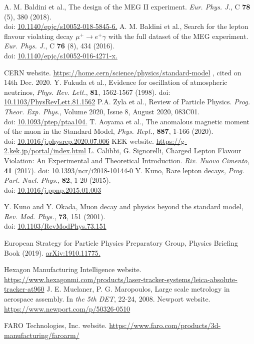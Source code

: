 \documentclass[report]{jsbook}
\begin{document}
\begin{thebibliography}{99}
 A. M. Baldini et al., The design of the MEG II experiment. {\it Eur. Phys. J.}, C {\bf 78} (5), 380 (2018). \\ 
doi: \href{https://doi.org/10.1140/epjc/s10052-018-5845-6}{10.1140/epjc/s10052-018-5845-6.}
 A. M. Baldini et al., Search for the lepton flavour violating decay $\mu^+ \to e^+ \gamma$ with the full dataset of the MEG experiment. {\it Eur. Phys. J.}, C {\bf 76} (8), 434 (2016). \\ 
doi: \href{https://doi.org/10.1140/epjc/s10052-016-4271-x}{10.1140/epjc/s10052-016-4271-x.}

 CERN website. \url{https://home.cern/science/physics/standard-model} , cited on 14th Dec. 2020.
 Y. Fukuda et al., Evidence for oscillation of atmospheric neutrinos, {\it Phys. Rev. Lett.}, {\bf 81}, 1562-1567 (1998). 
doi: \href{https://doi.org/10.1103/PhysRevLett.81.1562}{10.1103/PhysRevLett.81.1562}
 P.A. Zyla et al., Review of Particle Physics.  {\it Prog. Theor. Exp. Phys.}, Volume 2020, Issue 8, August 2020, 083C01. \\
doi: \href{https://doi.org/10.1093/ptep/ptaa104}{10.1093/ptep/ptaa104.}
 T. Aoyama et al., The anomalous magnetic moment of the muon in the Standard Model, {\it Phys. Rept.}, {\bf 887}, 1-166 (2020). \\
doi: \href{https://doi.org/10.1016/j.physrep.2020.07.006}{10.1016/j.physrep.2020.07.006}
 KEK website. \url{https://g-2.kek.jp/portal/index.html}
 L. Calibbi, G. Signorelli, Charged Lepton Flavour Violation: An Experimental and Theoretical Introduction. {\it Riv. Nuovo Cimento}, {\bf 41} (2017).
doi: \href{https://doi.org/10.1393/ncr/i2018-10144-0}{10.1393/ncr/i2018-10144-0}
 Y. Kuno, Rare lepton decays, {\it Prog. Part. Nucl. Phys.}, {\bf 82}, 1-20 (2015). \\
doi: \href{https://doi.org/10.1016/j.ppnp.2015.01.003}{10.1016/j.ppnp.2015.01.003}


 Y. Kuno and Y. Okada, Muon decay and physics beyond the standard model, {\it Rev. Mod. Phys.}, {\bf 73}, 151 (2001). \\
doi: \href{http://dx.doi.org/10.1103/RevModPhys.73.151}{10.1103/RevModPhys.73.151}

 European Strategy for Particle Physics Preparatory Group, Physics Briefing Book (2019). \href{http://arxiv.org/abs/1910.11775}{arXiv:1910.11775.} 

 Hexagon Manufacturing Intelligence website. \url{https://www.hexagonmi.com/products/laser-tracker-systems/leica-absolute-tracker-at960}
 J. E. Muelaner, P. G. Maropoulos, Large scale metrology in aerospace assembly. In {\it the 5th DET}, 22-24, 2008.
 Newport website. \url{https://www.newport.com/p/50326-0510}

 FARO Technologies, Inc. website. \url{https://www.faro.com/products/3d-manufacturing/faroarm/}
\end{thebibliography}
\end{document}
